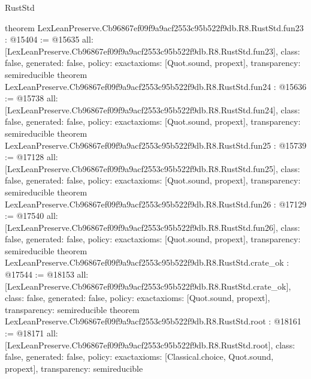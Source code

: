 \begin{lexlean}{RustStd}
\begin{coremodule}
{}
theorem LexLeanPreserve.Cb96867ef09f9a9acf2553c95b522f9db.R8.RustStd.fun23 : @15404 := @15635 {
  all: [LexLeanPreserve.Cb96867ef09f9a9acf2553c95b522f9db.R8.RustStd.fun23],
  class: false,
  generated: false,
  policy: exact{axioms: [Quot.sound, propext]},
  transparency: semireducible
}
theorem LexLeanPreserve.Cb96867ef09f9a9acf2553c95b522f9db.R8.RustStd.fun24 : @15636 := @15738 {
  all: [LexLeanPreserve.Cb96867ef09f9a9acf2553c95b522f9db.R8.RustStd.fun24],
  class: false,
  generated: false,
  policy: exact{axioms: [Quot.sound, propext]},
  transparency: semireducible
}
theorem LexLeanPreserve.Cb96867ef09f9a9acf2553c95b522f9db.R8.RustStd.fun25 : @15739 := @17128 {
  all: [LexLeanPreserve.Cb96867ef09f9a9acf2553c95b522f9db.R8.RustStd.fun25],
  class: false,
  generated: false,
  policy: exact{axioms: [Quot.sound, propext]},
  transparency: semireducible
}
theorem LexLeanPreserve.Cb96867ef09f9a9acf2553c95b522f9db.R8.RustStd.fun26 : @17129 := @17540 {
  all: [LexLeanPreserve.Cb96867ef09f9a9acf2553c95b522f9db.R8.RustStd.fun26],
  class: false,
  generated: false,
  policy: exact{axioms: [Quot.sound, propext]},
  transparency: semireducible
}
theorem LexLeanPreserve.Cb96867ef09f9a9acf2553c95b522f9db.R8.RustStd.crate_ok : @17544 := @18153 {
  all: [LexLeanPreserve.Cb96867ef09f9a9acf2553c95b522f9db.R8.RustStd.crate_ok],
  class: false,
  generated: false,
  policy: exact{axioms: [Quot.sound, propext]},
  transparency: semireducible
}
theorem LexLeanPreserve.Cb96867ef09f9a9acf2553c95b522f9db.R8.RustStd.root : @18161 := @18171 {
  all: [LexLeanPreserve.Cb96867ef09f9a9acf2553c95b522f9db.R8.RustStd.root],
  class: false,
  generated: false,
  policy: exact{axioms: [Classical.choice, Quot.sound, propext]},
  transparency: semireducible
}


\end{coremodule}
\end{lexlean}
